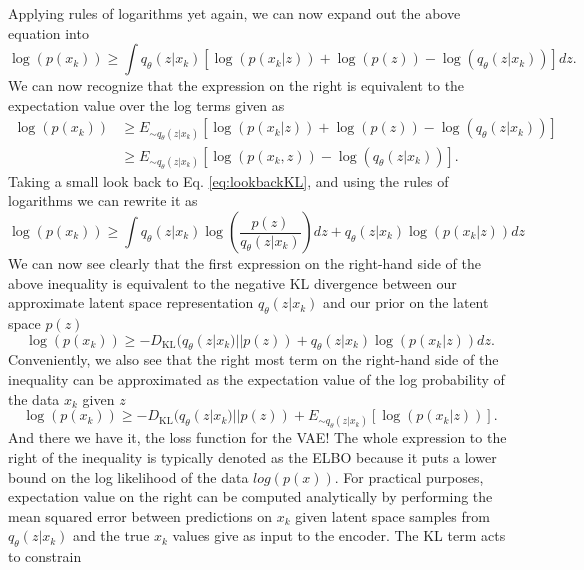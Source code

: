 %
Applying rules of logarithms yet again, we can now expand 
out the above equation into 
\begin{equation}
    \log(p(x_k)) \geq \int q_{\theta}(z|x_k)
    [\log(p(x_k|z)) + \log(p(z)) - \log(q_{\theta}(z|x_k))] dz.
\end{equation}
We can now recognize that the expression on the right 
is equivalent to the expectation value over the log 
terms given as 
\begin{align}
    \log(p(x_k)) &\geq E_{\sim q_{\theta}(z|x_k)} 
    [\log(p(x_k|z)) + \log(p(z)) - \log(q_{\theta}(z|x_k))] \nonumber \\
    &\geq E_{\sim q_{\theta}(z|x_k)} 
    [\log(p(x_k,z)) - \log(q_{\theta}(z|x_k))].
\end{align}
Taking a small look back to Eq. \ref{eq:lookbackKL}, 
and using the rules of logarithms we can rewrite it as 
\begin{equation}
    \log(p(x_k)) \geq \int q_{\theta}(z|x_k)
    \log\left(\frac{p(z)}{q_{\theta}(z|x_k)}\right)dz + 
    q_{\theta}(z|x_k) \log({p(x_k|z)}) dz
\end{equation}
We can now see clearly that the first expression on the 
right-hand side of the above inequality is equivalent to the 
negative \ac{KL} divergence between our approximate latent space 
representation $q_{\theta}(z|x_k)$ and our prior on 
the latent space $p(z)$
\begin{equation}
    \log(p(x_k)) \geq - D_{\textrm{KL}}(q_{\theta}(z|x_k) || p(z)) + 
    q_{\theta}(z|x_k) \log({p(x_k|z)}) dz. 
\end{equation}
Conveniently, we also see that the right most term on the 
right-hand side of the inequality can be approximated as the 
expectation value of the log probability of the data $x_k$ 
given $z$
\begin{equation}
    \log(p(x_k)) \geq - D_{\textrm{KL}}(q_{\theta}(z|x_k) || p(z)) + 
    E_{\sim q_{\theta}(z|x_k)}[ \log({p(x_k|z)})].\label{eq:vae_loss}
\end{equation}
And there we have it, the loss function for the \ac{VAE}! 
The whole expression to the right of the inequality
is typically denoted as the \ac{ELBO} because it puts a 
lower bound on the log likelihood of the data $log(p(x))$. For 
practical purposes, expectation value on the right can be computed analytically 
by performing the mean squared error between predictions on $x_k$ given 
latent space samples from $q_{\theta}(z|x_k)$ and the true 
$x_k$ values give as input to the encoder. The KL term acts to constrain 
